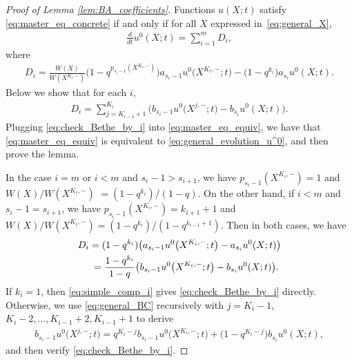 \documentclass[11pt]{article}
\numberwithin{equation}{section}
\begin{document}
\begin{proof}[Proof of Lemma \ref{lem:BA_coefficients}]
 Functions $u(X; t)$ satisfy \eqref{eq:master_eq_concrete} if and only if for all $X$ expressed in~\eqref{eq:general_X},
 \begin{gather} \label{eq:master_eq_equiv}
 \frac{d}{dt} u^0(X; t) = \sum^m_{i = 1} D_i,
 \end{gather}
 where
 \begin{gather*}
 D_i = \frac{W(X)}{W(X^{K_i, -})} \big(1 - q^{p_{s_i - 1}(X^{K_i, -})}\big) a_{s_i - 1} u^0\big(X^{K_i, -}; t\big) - \big(1 - q^{k_i}\big) a_{s_i} u^0(X; t).
 \end{gather*}
 Below we show that for each $i$,
 \begin{gather} \label{eq:check_Bethe_by_i}
 D_i = \sum^{K_i}_{j = K_{i - 1} + 1} \big( b_{s_i - 1} u^0\big(X^{ j, -}; t\big) - b_{s_i} u^0(X; t) \big).
 \end{gather}
 Plugging \eqref{eq:check_Bethe_by_i} into \eqref{eq:master_eq_equiv}, we have that \eqref{eq:master_eq_equiv} is equivalent to \eqref{eq:general_evolution_u^0}, and then prove the lemma.

 In the case $i = m$ or $i < m$ and $s_{i} - 1 > s_{i + 1}$, we have $p_{s_i - 1}(X^{K_i, -}) = 1$ and $W(X)/W(X^{K_i, -})$ $= (1 - q^{k_i})/(1 - q)$. On the other hand, if $i < m$ and $s_i - 1 = s_{i + 1}$, we have $p_{s_i - 1}(X^{K_i, -}) = k_{i + 1} + 1$ and $W(X)/W(X^{K_i, -}) = (1 - q^{k_i})/(1 - q^{k_{i - 1} + 1})$. Then in both cases, we have
 \begin{gather}
 D_i = (1 - q^{k_i}) \big( a_{s_i - 1} u^0\big(X^{K_i, -}; t\big) - a_{s_i} u^0(X; t) \big) \nonumber\\
 \hphantom{D_i}{} = \frac{1 - q^{k_i}}{1 - q} \big( b_{s_i - 1} u^0\big(X^{K_i, -}; t\big) - b_{s_i} u^0(X; t) \big).\label{eq:simple_comp_i}
 \end{gather}
 If $k_i = 1$, then \eqref{eq:simple_comp_i} gives \eqref{eq:check_Bethe_by_i} directly. Otherwise, we use \eqref{eq:general_BC} recursively with $j = K_i - 1$, $K_i - 2, \dotsc, K_{i - 1} + 2, K_{i - 1} + 1$ to derive
 \begin{gather*}
 b_{s_i - 1} u^0\big(X^{j, -}; t\big) = q^{K_i - j} b_{s_i - 1} u^0\big(X^{K_i, -}; t\big) + \big(1 - q^{K_i - j}\big) b_{s_i} u^0(X; t),
 \end{gather*}
 and then verify \eqref{eq:check_Bethe_by_i}.
\end{proof}
\end{document}
